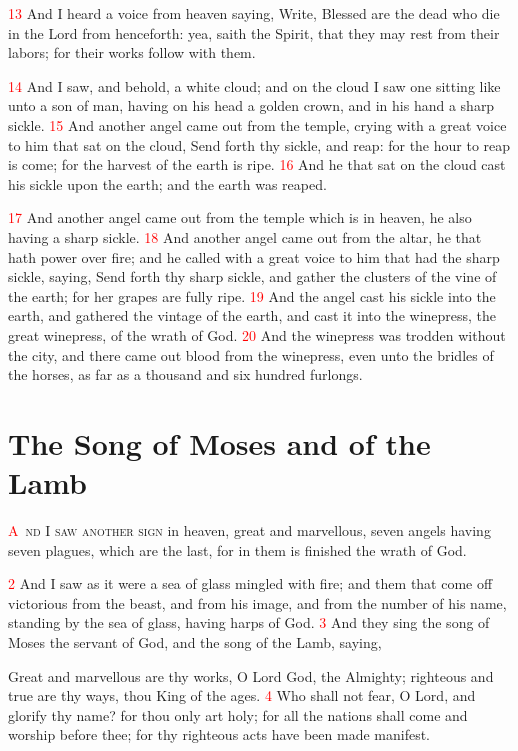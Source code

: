 \documentclass[12pt,twoside]{memoir}
\newcommand{\vnum}[1]{\textcolor{red}{\normalsize{#1}}}
\begin{document}
\vnum{13} And I heard a voice from heaven saying, Write, Blessed are the dead who die in the Lord from henceforth: yea, saith the Spirit, that they may rest from their labors; for their works follow with them.

\vnum{14} And I saw, and behold, a white cloud; and on the cloud I saw one sitting like unto a son of man, having on his head a golden crown, and in his hand a sharp sickle. 
\vnum{15} And another angel came out from the temple, crying with a great voice to him that sat on the cloud, Send forth thy sickle, and reap: for the hour to reap is come; for the harvest of the earth is ripe. 
\vnum{16} And he that sat on the cloud cast his sickle upon the earth; and the earth was reaped.

\vnum{17} And another angel came out from the temple which is in heaven, he also having a sharp sickle. 
\vnum{18} And another angel came out from the altar, he that hath power over fire; and he called with a great voice to him that had the sharp sickle, saying, Send forth thy sharp sickle, and gather the clusters of the vine of the earth; for her grapes are fully ripe. 
\vnum{19} And the angel cast his sickle into the earth, and gathered the vintage of the earth, and cast it into the winepress, the great winepress, of the wrath of God. 
\vnum{20} And the winepress was trodden without the city, and there came out blood from the winepress, even unto the bridles of the horses, as far as a thousand and six hundred furlongs.


\chapter{The Song of Moses and of the Lamb}
\lettrine[lines=3,slope=-0.5em]{\textcolor{red}{A}}{\ nd I saw another sign} in heaven, great and marvellous, seven angels having seven plagues, which are the last, for in them is finished the wrath of God.

\vnum{2} And I saw as it were a sea of glass mingled with fire; and them that come off victorious from the beast, and from his image, and from the number of his name, standing by the sea of glass, having harps of God. 
\vnum{3} And they sing the song of Moses the servant of God, and the song of the Lamb, saying,

Great and marvellous are thy works, O Lord God, the Almighty; righteous and true are thy ways, thou King of the ages. 
\vnum{4} Who shall not fear, O Lord, and glorify thy name? for thou only art holy; for all the nations shall come and worship before thee; for thy righteous acts have been made manifest.
\end{document}
